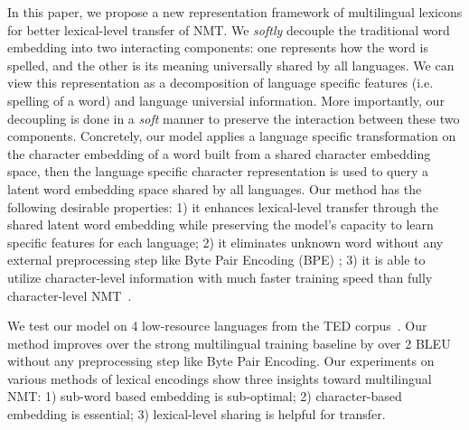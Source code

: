 In this paper, we propose a new representation framework of multilingual lexicons for better lexical-level transfer of NMT. We \textit{softly} decouple the traditional word embedding into two interacting components: one represents how the word is spelled, and the other is its meaning universally shared by all languages. We can view this representation as a decomposition of language specific features (i.e. spelling of a word) and language universial information. More importantly, our decoupling is done in a \textit{soft} manner to preserve the interaction between these two components. Concretely, our model applies a language specific transformation on the character embedding of a word built from a shared character embedding space, then the language specific character representation is used to query a latent word embedding space shared by all languages. Our method has the following desirable properties: 1) it enhances lexical-level transfer through the shared latent word embedding while preserving the model's capacity to learn specific features for each language; 2) it eliminates unknown word without any external preprocessing step like Byte Pair Encoding (BPE) \citep{bpe}; 3) it is able to utilize character-level information with much faster training speed than fully character-level NMT~\citep{fully_char_nmt,char_nmt_compression}.

We test our model on 4 low-resource languages from the TED corpus~\citep{ted_pretrain_emb}. Our method improves over the strong multilingual training baseline by over 2 BLEU without any preprocessing step like Byte Pair Encoding. Our experiments on various methods of lexical encodings show three insights toward multilingual NMT: 1) sub-word based embedding is sub-optimal; 2) character-based embedding is essential; 3) lexical-level sharing is helpful for transfer.